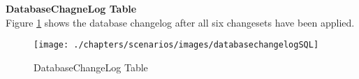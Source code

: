 \textbf{DatabaseChagneLog Table}\\
%
Figure \ref{fig:scenarios:LiquibaseDBCLYAML} shows the database changelog after all six changesets have been applied.

\begin{figure}[H]
	\centering
	\texttt{[image: ./chapters/scenarios/images/databasechangelogSQL]}
	\caption[DatabaseChangeLog Table - Source: Own illustration]{DatabaseChangeLog Table}
	\label{fig:scenarios:LiquibaseDBCLYAML}
\end{figure}

\newpage
